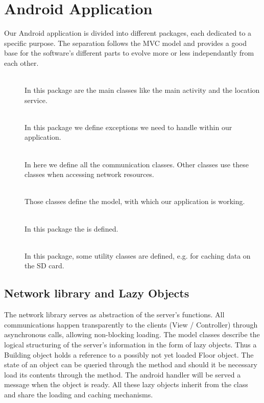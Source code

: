 \section{Android Application}
Our Android application is divided into different packages, each dedicated to a specific purpose. The separation follows the MVC model and provides a good base for the software's different parts to evolve more or less independantly from each other.
\begin{description}
	\item[]\hfill\\In this package are the main classes like the main activity and the location service.
	\item[]\hfill\\In this package we define exceptions we need to handle within our application.
	\item[]\hfill\\In here we define all the communication classes. Other classes use these classes when accessing network resources.
	\item[]\hfill\\Those classes define the model, with which our application is working.
	\item[]\hfill\\In this package the  is defined.
	\item[]\hfill\\In this package, some utility classes are defined, e.g. for caching data on the SD card.
\end{description}

\subsection{Network library and Lazy Objects}
The network library serves as abstraction of the server's functions. All communications happen transparently to the clients (View / Controller) through asynchronous calls, allowing non-blocking loading. The model classes describe the logical structuring of the server's information in the form of lazy objects. Thus a Building object holds a reference to a possibly not yet loaded Floor object. The state of an object can be queried through the  method and should it be necessary load its contents through the  method. The android handler will be served a message when the object is ready. All these lazy objects inherit from the  class and share the loading and caching mechanisms.

